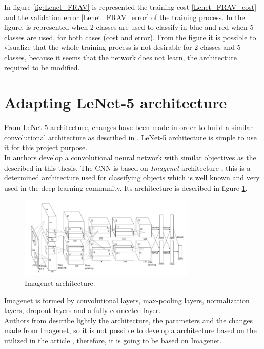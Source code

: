 In figure \ref{fig:Lenet_FRAV} is represented the training cost \ref{Lenet_FRAV_cost} and the validation error \ref{Lenet_FRAV_error} of the training process. In the figure, is represented when 2 classes are used to classify in  blue and red when 5 classes are used, for both cases (cost and error). From the figure it is possible to visualize that the whole training process is not desirable for 2 classes and 5 classes, because it seems that the network does not learn, the architecture required to be modified.

\section{Adapting LeNet-5 architecture} \label{sec:adapt_lenet}
From LeNet-5 architecture, changes have been made in order to build a similar convolutional architecture as described in \cite{yangLL14}. LeNet-5 architecture is simple to use it for this project purpose.\\

In \cite{yangLL14} authors develop a convolutional neural network with similar objectives as the described in this thesis. The CNN is based on \textit{Imagenet} architecture \cite{imagenet}, this is a determined architecture used for classifying objects which is well known and very used in the deep learning community. Its architecture is described in figure \ref{fig:Imagenet_architecture}.\\

\begin{figure}[tb]
\centering
\includegraphics[width=0.75\textwidth]{images_miscelaneus/Imagenet.png}
\caption{Imagenet architecture.} \label{fig:Imagenet_architecture}
\end{figure}

Imagenet is formed by convolutional layers, max-pooling layers, normalization layers, dropout layers and a fully-connected layer.\\

Authors from \cite{yangLL14} describe lightly the architecture, the parameters and the changes made from Imagenet, so it is not possible to develop a architecture based on the utilized in the article \cite{yangLL14}, therefore, it is going to be based on Imagenet.\\

